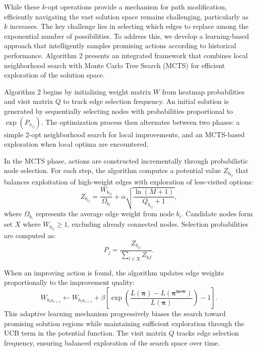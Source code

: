 \documentclass[sigconf]{acmart}
\begin{document}
While these $k$-opt operations provide a mechanism for path modification, efficiently navigating the vast solution space remains challenging, particularly as $k$ increases. The key challenge lies in selecting which edges to replace among the exponential number of possibilities. To address this, we develop a learning-based approach that intelligently samples promising actions according to historical performance. Algorithm 2 presents an integrated framework that combines local neighborhood search with Monte Carlo Tree Search (MCTS) for efficient exploration of the solution space.



Algorithm 2 begins by initializing weight matrix $W$ from heatmap probabilities and visit matrix $Q$ to track edge selection frequency. An initial solution is generated by sequentially selecting nodes with probabilities proportional to $\exp(P_{\pi_{i j}})$. The optimization process then alternates between two phases: a simple 2-opt neighborhood search for local improvements, and an MCTS-based exploration when local optima are encountered.





In the MCTS phase, actions are constructed incrementally through probabilistic node selection. For each step, the algorithm computes a potential value $Z_{b_{i j}}$ that balances exploitation of high-weight edges with exploration of less-visited options:
\begin{equation}
    Z_{b_{i j}} = \frac{W_{b_{i j}}}{\Omega_{b_i}} + \alpha\sqrt{\frac{\ln(M+1)}{Q_{b_{i j}}+1}},
\end{equation}
where $\Omega_{b_i}$ represents the average edge weight from node $b_i$. Candidate nodes form set $X$ where $W_{b_{i j}} \geq 1$, excluding already connected nodes. Selection probabilities are computed as:
\begin{equation}
    P_{j} = \frac{Z_{b_{i j}}}{\sum_{l \in X} Z_{b_i l}}.
\end{equation}

When an improving action is found, the algorithm updates edge weights proportionally to the improvement quality:
\begin{equation}
    W_{b_i a_{i+1}} \gets W_{b_i a_{i+1}} + \beta\left[\exp\left(\frac{L(\boldsymbol{\pi}) - L(\boldsymbol{\pi^{new}})}{L(\boldsymbol{\pi})}\right) - 1\right].
\end{equation}
This adaptive learning mechanism progressively biases the search toward promising solution regions while maintaining sufficient exploration through the UCB term in the potential function. The visit matrix $Q$ tracks edge selection frequency, ensuring balanced exploration of the search space over time.
\end{document}
